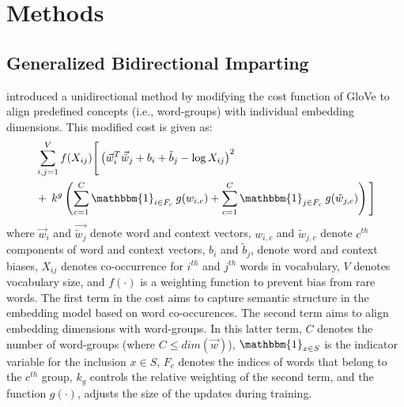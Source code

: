 \documentclass[11pt,a4paper]{article}
\newcommand{\indicator}{\ensuremath{\mathbbm{1}}}
\begin{document}
\section{Methods} \label{sec:methods}


\subsection{Generalized Bidirectional Imparting }
\label{sec:gen_imparting}
\citep{senel20impart} introduced a
unidirectional method   by modifying the cost function of  GloVe  to align predefined concepts (i.e., word-groups) with individual embedding dimensions. This modified cost is given as:
\begin{align}
\begin{split}
	 &\sum_{i,j=1}^{V} f(X_{ij}) \Bigg[ \left(\vec{w}_i^T\vec{\tilde{w}}_j + b_i + \tilde{b}_j -\log{}X_{ij}\right)^2 \\
	      & +\: k^g\left(\sum_{c=1}^{C} \indicator_{i\in{}F_c} \: g(w_{i,c}) + \sum_{c=1}^{C} \indicator_{j \in F_c} \: g(\tilde{w}_{j,c})  \right) \Bigg] 
\end{split}
\label{eq:glove_uni}
\end{align}
where $\vec{w}_i$ and $\vec{\tilde{w}_j}$ denote word and context vectors, $w_{i,c}$ and $\tilde{w}_{j,c}$ denote $c^{th}$ components of word and context vectors, $b_i$ and $\tilde{b}_j$, denote word and context biases, $X_{ij}$ denotes co-occurrence for $i^{th}$ and $j^{th}$ words in vocabulary, $V$ denotes vocabulary size, and $f(\cdot)$ is a weighting function to prevent bias from rare words. The first term in the cost aims to capture semantic structure in the embedding model based on word co-occurences. The second term aims to align embedding dimensions with word-groups. In this latter term, $C$ denotes the number of word-groups (where $C\leq dim(\vec{w})$), $\indicator_{x \in S}$ is the indicator variable for the inclusion ${x \in S}$, $F_c$ denotes the indices of words that belong to the $c^{th}$ group, $k_g$ controls the relative weighting of the second term, and the function $g(\cdot)$, adjusts the size of the updates during training. 
\end{document}
